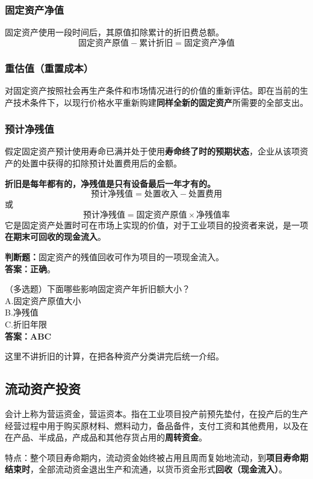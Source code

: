 \subsubsection{固定资产净值}
固定资产使用一段时间后，其原值扣除累计的折旧费总额。
$$\mbox{固定资产原值}-\mbox{累计折旧}=\mbox{固定资产净值}$$

\subsubsection{重估值（重置成本）}
对固定资产按照社会再生产条件和市场情况进行的价值的重新评估。即在当前的生产技术条件下，以现行价格水平重新购建\textbf{同样全新的固定资产}所需要的全部支出。

\subsubsection{预计净残值}
假定固定资产预计使用寿命已满并处于使用\textbf{寿命终了时的预期状态}，企业从该项资产的处置中获得的扣除预计处置费用后的金额。

\textbf{折旧是每年都有的，净残值是只有设备最后一年才有的。}
$$\mbox{预计净残值}=\mbox{处置收入}-\mbox{处置费用}$$
或
$$\mbox{预计净残值}=\mbox{固定资产原值} \times \mbox{净残值率}$$
它是固定资产处置时可在市场上实现的价值，对于工业项目的投资者来说，是一项\textbf{在期末可回收的现金流入}。

\noindent \textbf{判断题：}固定资产的残值回收可作为项目的一项现金流入。\\
\textbf{答案：正确}。

\noindent （多选题）下面哪些影响固定资产年折旧额大小？\\
A.固定资产原值大小\\
B.净残值\\
C.折旧年限\\
\textbf{答案：ABC}

这里不讲折旧的计算，在把各种资产分类讲完后统一介绍。

\subsection{流动资产投资}
会计上称为营运资金，营运资本。指在工业项目投产前预先垫付，在投产后的生产经营过程中用于购买原材料、燃料动力，备品备件，支付工资和其他费用，以及在在产品、半成品，产成品和其他存货占用的\textbf{周转资金}。

特点：整个项目寿命期内，流动资金始终被占用且周而复始地流动，到\textbf{项目寿命期结束时}，全部流动资金退出生产和流通，以货币资金形式\textbf{回收（现金流入）}。

